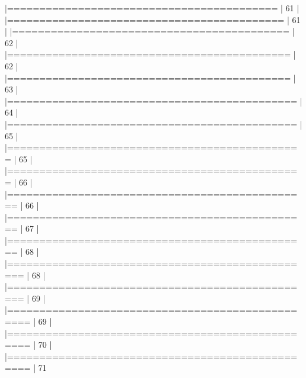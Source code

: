 \documentclass{article}
\begin{document}
\begin{Schunk}
\begin{Soutput}
  |==========================================                            |  61%
  |                                                                            
  |===========================================                           |  61%
  |                                                                            
  |===========================================                           |  62%
  |                                                                            
  |============================================                          |  62%
  |                                                                            
  |============================================                          |  63%
  |                                                                            
  |=============================================                         |  64%
  |                                                                            
  |=============================================                         |  65%
  |                                                                            
  |==============================================                        |  65%
  |                                                                            
  |==============================================                        |  66%
  |                                                                            
  |===============================================                       |  66%
  |                                                                            
  |===============================================                       |  67%
  |                                                                            
  |===============================================                       |  68%
  |                                                                            
  |================================================                      |  68%
  |                                                                            
  |================================================                      |  69%
  |                                                                            
  |=================================================                     |  69%
  |                                                                            
  |=================================================                     |  70%
  |                                                                            
  |=================================================                     |  71%

\end{Soutput}
\end{Schunk}
\end{document}
